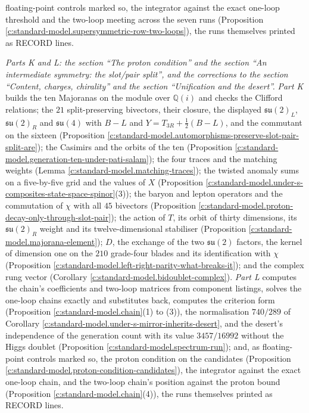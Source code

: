 \documentclass[11pt]{article}
\theoremstyle{definition}
\theoremstyle{plain}
\providecommand{\su}{}\renewcommand{\su}{\mathfrak{su}}
\begin{document}
floating-point controls marked so, the integrator against the exact one-loop threshold and the two-loop meeting across the seven runs (Proposition \ref{c:standard-model.supersymmetric-row-two-loops}), the runs themselves printed as RECORD lines.

\emph{Parts K and L: the section ``The proton condition'' and the section ``An intermediate symmetry: the slot/pair split'', and the corrections to the section ``Content, charges, chirality'' and the section ``Unification and the desert''.} \emph{Part K} builds the ten Majoranas on the module over $\mathbb{Q}(i)$ and checks the Clifford relations; the $21$ split-preserving bivectors, their closure, the displayed $\su(2)_{L}$, $\su(2)_{R}$ and $\su(4)$ with $B - L$ and $Y = T_{3R} + \tfrac12(B - L)$, and the commutant on the sixteen (Proposition \ref{c:standard-model.automorphisms-preserve-slot-pair-split-are}); the Casimirs and the orbits of the ten (Proposition \ref{c:standard-model.generation-ten-under-pati-salam}); the four traces and the matching weights (Lemma \ref{c:standard-model.matching-traces}); the twisted anomaly sums on a five-by-five grid and the values of $X$ (Proposition \ref{c:standard-model.under-s-composites-state-space-spinor}(3)); the baryon and lepton operators and the commutation of $\chi$ with all $45$ bivectors (Proposition \ref{c:standard-model.proton-decay-only-through-slot-pair}); the action of $T$, its orbit of thirty dimensions, its $\su(2)_{R}$ weight and its twelve-dimensional stabiliser (Proposition \ref{c:standard-model.majorana-element}); $D$, the exchange of the two $\su(2)$ factors, the kernel of dimension one on the $210$ grade-four blades and its identification with $\chi$ (Proposition \ref{c:standard-model.left-right-parity-what-breaks-it}); and the complex rung vector (Corollary \ref{c:standard-model.bidoublet-complex}). \emph{Part L} computes the chain's coefficients and two-loop matrices from component listings, solves the one-loop chains exactly and substitutes back, computes the criterion form (Proposition \ref{c:standard-model.chain}(1) to (3)), the normalisation $740/289$ of Corollary \ref{c:standard-model.under-s-mirror-inherits-desert}, and the desert's independence of the generation count with its value $3457/16992$ without the Higgs doublet (Proposition \ref{c:standard-model.spectrum-run}); and, as floating-point controls marked so, the proton condition on the candidates (Proposition \ref{c:standard-model.proton-condition-candidates}), the integrator against the exact one-loop chain, and the two-loop chain's position against the proton bound (Proposition \ref{c:standard-model.chain}(4)), the runs themselves printed as RECORD lines.
\end{document}
